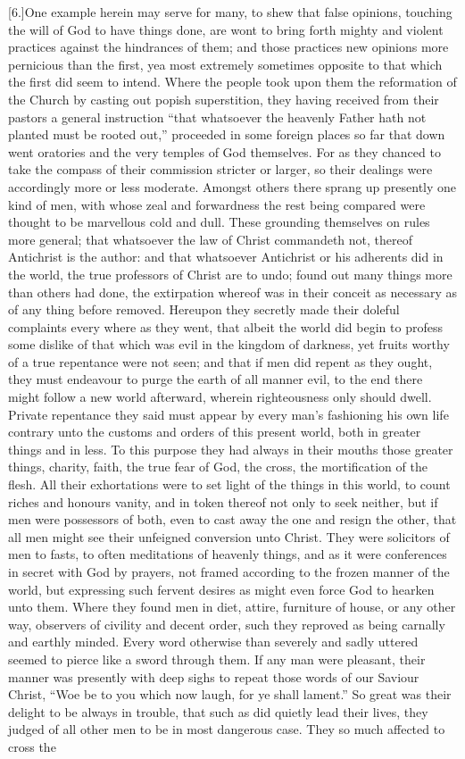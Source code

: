 [6.]One example herein may serve for many, to shew that false opinions, touching the will of God to have things done, are wont to bring forth mighty and violent practices against the hindrances of them; and those practices new opinions more pernicious than the first, yea most extremely sometimes opposite to that which the first did seem to intend. Where the people took upon them the reformation of the Church by casting out popish superstition, they having received from their pastors a general instruction “that whatsoever the heavenly Father hath not planted must be rooted out,” proceeded in some foreign places so far that down went oratories and the very temples of God themselves. For as they chanced to take the compass of their commission stricter or larger, so their dealings were accordingly more or less moderate. Amongst others there sprang up presently one kind of men, with whose zeal and forwardness the rest being compared were thought to be marvellous cold and dull. These grounding themselves on rules more general; that whatsoever the law of Christ commandeth not, thereof Antichrist is the author: and that whatsoever Antichrist or his adherents did in the world, the true professors of Christ are to undo; found out many things more than others had done, the extirpation whereof was in their conceit as necessary as of any thing before removed. Hereupon they secretly made their doleful complaints every where as they went, that albeit the world did begin to profess some dislike of that which was evil in the kingdom of darkness, yet fruits worthy of a true repentance were not seen; and that if men did repent as they ought, they must endeavour to purge the earth of all manner evil, to the end there might follow a new world afterward, wherein righteousness only should dwell. Private repentance they said must appear by every man’s fashioning his own life contrary unto the customs and orders of this present world, both in greater things and in less. To this purpose they had always in their mouths those greater things, charity, faith, the true fear of God, the cross, the mortification of the flesh. All their exhortations were to set light of the things in this world, to count riches and honours vanity, and in token thereof not only to seek neither, but if men were possessors of both, even to cast away the one and resign the other, that all men might see their unfeigned conversion unto Christ. They were solicitors of men to fasts, to often meditations of heavenly things, and as it were conferences in secret with God by prayers, not framed according to the frozen manner of the world, but expressing such fervent desires as might even force God to hearken unto them. Where they found men in diet, attire, furniture of house, or any other way, observers of civility and decent order, such they reproved as being carnally and earthly minded. Every word otherwise than severely and sadly uttered seemed to pierce like a sword through them. If any man were pleasant, their manner was presently with deep sighs to repeat those words of our Saviour Christ, “Woe be to you which now laugh, for ye shall lament.” So great was their delight to be always in trouble, that such as did quietly lead their lives, they judged of all other men to be in most dangerous case. They so much affected to cross the 